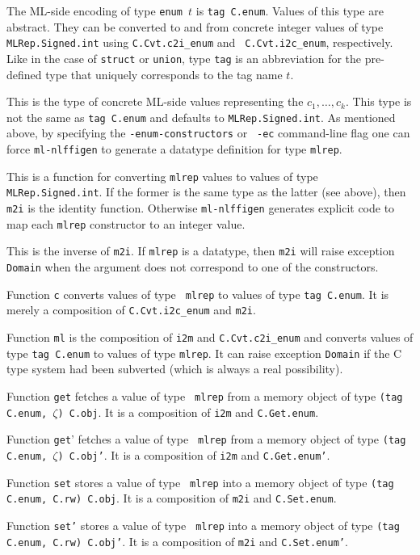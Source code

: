 \documentclass[titlepage,letterpaper]{article}
\newcommand{\gentool}{{\tt ml-nlffigen}}
\begin{document}
\begin{description}\setlength{\itemsep}{0pt}
\item[{\tt type tag}] The ML-side encoding of type {\tt enum $t$} is
  {\tt tag C.enum}.  Values of this type are abstract.  They can be
  converted to and from concrete integer values of type {\tt
    MLRep.Signed.int} using {\tt C.Cvt.c2i\_enum} and {\tt
    C.Cvt.i2c\_enum}, respectively.  Like in the case of {\tt struct}
  or {\tt union}, type {\tt tag} is an abbreviation for the
  pre-defined type that uniquely corresponds to the tag name $t$.
\item[{\tt type mlrep}] This is the type of concrete ML-side values
  representing the $c_1,\ldots,c_k$.  This type is not the same as
  {\tt tag C.enum} and defaults to {\tt MLRep.Signed.int}.  As
  mentioned above, by specifying the {\tt -enum-constructors} or {\tt
    -ec} command-line flag one can force {\gentool} to generate a
  datatype definition for type {\tt mlrep}.
\item[{\tt val m2i}] This is a function for converting {\tt mlrep}
  values to values of type {\tt MLRep.Signed.int}.  If the former is
  the same type as the latter (see above), then {\tt m2i} is the
  identity function.  Otherwise {\gentool} generates explicit code to
  map each {\tt mlrep} constructor to an integer value.
\item[{\tt val i2m}] This is the inverse of {\tt m2i}.  If {\tt mlrep}
  is a datatype, then {\tt m2i} will raise exception {\tt Domain} when
  the argument does not correspond to one of the constructors.
\item[{\tt val c}] Function {\tt c} converts values of type {\tt
    mlrep} to values of type {\tt tag C.enum}.  It is merely a
  composition of {\tt C.Cvt.i2c\_enum} and {\tt m2i}.
\item[{\tt val ml}] Function {\tt ml} is the composition of {\tt i2m}
  and {\tt C.Cvt.c2i\_enum} and converts values of type {\tt tag
    C.enum} to values of type {\tt mlrep}.  It can raise exception
  {\tt Domain} if the C type system had been subverted (which is
  always a real possibility).
\item[{\tt val get}] Function {\tt get} fetches a value of type {\tt
    mlrep} from a memory object of type {\tt (tag C.enum, $\zeta$)
    C.obj}.  It is a composition of {\tt i2m} and {\tt C.Get.enum}.
\item[{\tt val get'}] Function {\tt get}' fetches a value of type {\tt
    mlrep} from a memory object of type {\tt (tag C.enum, $\zeta$)
    C.obj'}.  It is a composition of {\tt i2m} and {\tt C.Get.enum'}.
\item[{\tt val set}] Function {\tt set} stores a value of type {\tt
    mlrep} into a memory object of type {\tt (tag C.enum, C.rw)
    C.obj}.  It is a composition of {\tt m2i} and {\tt C.Set.enum}.
\item[{\tt val set'}] Function {\tt set'} stores a value of type {\tt
    mlrep} into a memory object of type {\tt (tag C.enum, C.rw)
    C.obj'}.  It is a composition of {\tt m2i} and {\tt C.Set.enum'}.
\end{description}
\end{document}
